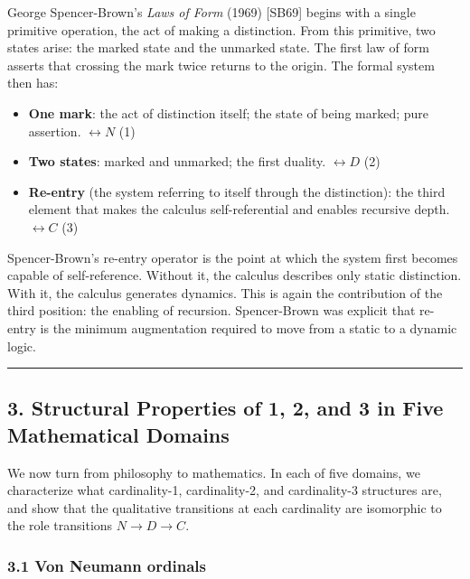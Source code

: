 \documentclass[
  11pt,
  letterpaper,
]{article}
\providecommand{\tightlist}{%
  \setlength{\itemsep}{0pt}\setlength{\parskip}{0pt}}
\begin{document}
George Spencer-Brown's \emph{Laws of Form} (1969) {[}SB69{]} begins with
a single primitive operation, the act of making a distinction. From this
primitive, two states arise: the marked state and the unmarked state.
The first law of form asserts that crossing the mark twice returns to
the origin. The formal system then has:

\begin{itemize}
\tightlist
\item
  \textbf{One mark}: the act of distinction itself; the state of being
  marked; pure assertion. \(\leftrightarrow N\) (1)
\item
  \textbf{Two states}: marked and unmarked; the first duality.
  \(\leftrightarrow D\) (2)
\item
  \textbf{Re-entry} (the system referring to itself through the
  distinction): the third element that makes the calculus
  self-referential and enables recursive depth. \(\leftrightarrow C\)
  (3)
\end{itemize}

Spencer-Brown's re-entry operator is the point at which the system first
becomes capable of self-reference. Without it, the calculus describes
only static distinction. With it, the calculus generates dynamics. This
is again the contribution of the third position: the enabling of
recursion. Spencer-Brown was explicit that re-entry is the minimum
augmentation required to move from a static to a dynamic logic.

\begin{center}\rule{0.5\linewidth}{0.5pt}\end{center}

\subsection{3. Structural Properties of 1, 2, and 3 in Five Mathematical
Domains}\label{structural-properties-of-1-2-and-3-in-five-mathematical-domains}

We now turn from philosophy to mathematics. In each of five domains, we
characterize what cardinality-1, cardinality-2, and cardinality-3
structures are, and show that the qualitative transitions at each
cardinality are isomorphic to the role transitions \(N \to D \to C\).

\subsubsection{3.1 Von Neumann ordinals}\label{von-neumann-ordinals}
\end{document}
